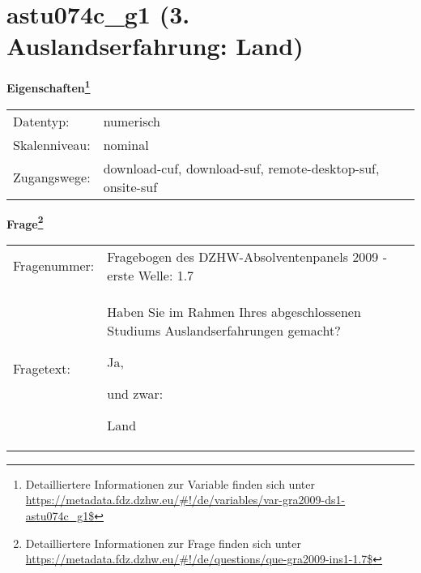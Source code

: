 
    \setcounter{footnote}{0}

    \vspace*{-1.8cm}
	\section{astu074c\_g1 (3. Auslandserfahrung: Land)}
	\label{section:astu074c_g1}



    \vspace*{0.5cm}
    \noindent\textbf{Eigenschaften\footnote{Detailliertere Informationen zur Variable finden sich unter
		\url{https://metadata.fdz.dzhw.eu/\#!/de/variables/var-gra2009-ds1-astu074c_g1$}}}\\
	\begin{tabularx}{\hsize}{@{}lX}
	Datentyp: & numerisch \\
	Skalenniveau: & nominal \\
	Zugangswege: &
	  download-cuf, 
	  download-suf, 
	  remote-desktop-suf, 
	  onsite-suf
 \\
    \end{tabularx}



				\vspace*{0.5cm}
                \noindent\textbf{Frage\footnote{Detailliertere Informationen zur Frage finden sich unter
		              \url{https://metadata.fdz.dzhw.eu/\#!/de/questions/que-gra2009-ins1-1.7$}}}\\
				\begin{tabularx}{\hsize}{@{}lX}
					Fragenummer: &
					  Fragebogen des DZHW-Absolventenpanels 2009 - erste Welle:
					  1.7
 \\
					Fragetext: & Haben Sie im Rahmen Ihres abgeschlossenen Studiums Auslandserfahrungen gemacht?\par  Ja,\par  und zwar:\par  Land \\
				\end{tabularx}





